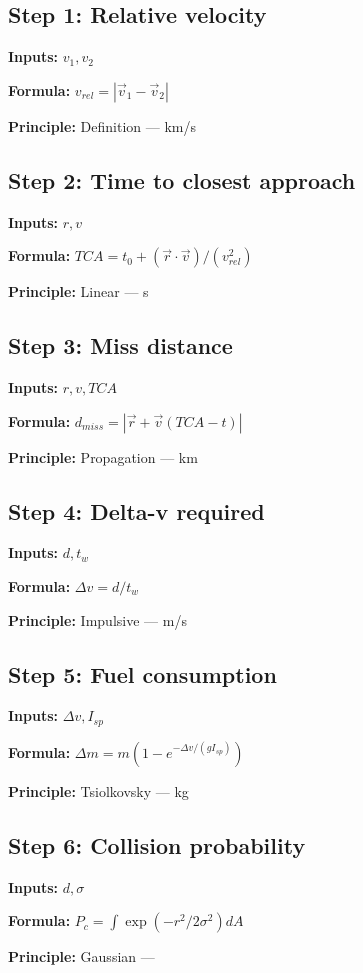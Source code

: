 \documentclass[11pt,twocolumn]{article}
\begin{document}
\subsection*{Step 1: Relative velocity}
\textbf{Inputs:} $v_1, v_2$

\textbf{Formula:} $v_{rel} = |\vec{v}_1 - \vec{v}_2|$

\textbf{Principle:} Definition --- km/s

\subsection*{Step 2: Time to closest approach}
\textbf{Inputs:} $r, v$

\textbf{Formula:} $TCA = t_0 + (\vec{r} \cdot \vec{v})/(v_{rel}^2)$

\textbf{Principle:} Linear --- s

\subsection*{Step 3: Miss distance}
\textbf{Inputs:} $r, v, TCA$

\textbf{Formula:} $d_{miss} = |\vec{r} + \vec{v}(TCA-t)|$

\textbf{Principle:} Propagation --- km

\subsection*{Step 4: Delta-v required}
\textbf{Inputs:} $d, t_w$

\textbf{Formula:} $\Delta v = d / t_w$

\textbf{Principle:} Impulsive --- m/s

\subsection*{Step 5: Fuel consumption}
\textbf{Inputs:} $\Delta v, I_{sp}$

\textbf{Formula:} $\Delta m = m(1-e^{-\Delta v/(g I_{sp})})$

\textbf{Principle:} Tsiolkovsky --- kg

\subsection*{Step 6: Collision probability}
\textbf{Inputs:} $d, \sigma$

\textbf{Formula:} $P_c = \int \exp(-r^2/2\sigma^2) dA$

\textbf{Principle:} Gaussian --- 
\end{document}
